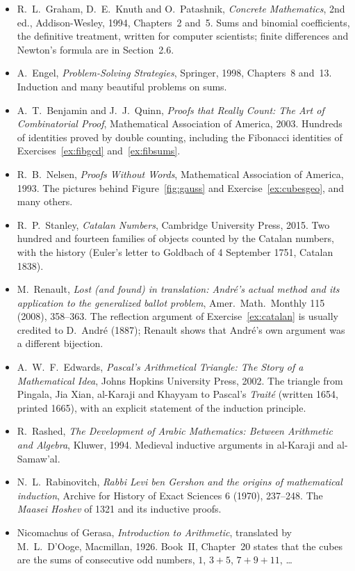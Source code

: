 \begin{itemize}\raggedright
\item R.~L.~Graham, D.~E.~Knuth and O.~Patashnik, \emph{Concrete Mathematics}, 2nd ed., Addison-Wesley, 1994, Chapters~2 and~5. Sums and binomial coefficients, the definitive treatment, written for computer scientists; finite differences and Newton's formula are in Section~2.6.
\item A.~Engel, \emph{Problem-Solving Strategies}, Springer, 1998, Chapters~8 and~13. Induction and many beautiful problems on sums.
\item A.~T.~Benjamin and J.~J.~Quinn, \emph{Proofs that Really Count: The Art of Combinatorial Proof}, Mathematical Association of America, 2003. Hundreds of identities proved by double counting, including the Fibonacci identities of Exercises~\ref{ex:fibgcd} and~\ref{ex:fibsums}.
\item R.~B.~Nelsen, \emph{Proofs Without Words}, Mathematical Association of America, 1993. The pictures behind Figure~\ref{fig:gauss} and Exercise~\ref{ex:cubesgeo}, and many others.
\item R.~P.~Stanley, \emph{Catalan Numbers}, Cambridge University Press, 2015. Two hundred and fourteen families of objects counted by the Catalan numbers, with the history (Euler's letter to Goldbach of 4 September 1751, Catalan 1838).
\item M.~Renault, \emph{Lost (and found) in translation: Andr\'e's actual method and its application to the generalized ballot problem}, Amer.\ Math.\ Monthly 115 (2008), 358--363. The reflection argument of Exercise~\ref{ex:catalan} is usually credited to D.~Andr\'e (1887); Renault shows that Andr\'e's own argument was a different bijection.
\item A.~W.~F.~Edwards, \emph{Pascal's Arithmetical Triangle: The Story of a Mathematical Idea}, Johns Hopkins University Press, 2002. The triangle from Pingala, Jia Xian, al-Karaji and Khayyam to Pascal's \emph{Trait\'e} (written 1654, printed 1665), with an explicit statement of the induction principle.
\item R.~Rashed, \emph{The Development of Arabic Mathematics: Between Arithmetic and Algebra}, Kluwer, 1994. Medieval inductive arguments in al-Karaji and al-Samaw'al.
\item N.~L.~Rabinovitch, \emph{Rabbi Levi ben Gershon and the origins of mathematical induction}, Archive for History of Exact Sciences 6 (1970), 237--248. The \emph{Maasei Hoshev} of 1321 and its inductive proofs.
\item Nicomachus of Gerasa, \emph{Introduction to Arithmetic}, translated by M.~L.~D'Ooge, Macmillan, 1926. Book~II, Chapter~20 states that the cubes are the sums of consecutive odd numbers, $1$, $3+5$, $7+9+11$, \dots

\end{itemize}
